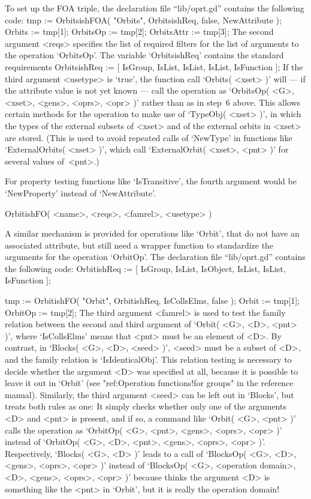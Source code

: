 To set  up the FOA  triple, the declaration file ``lib/oprt.gd'' contains
the following code:
\begintt
    tmp := OrbitsishFOA( "Orbits", OrbitsishReq, false, NewAttribute );
    Orbits     := tmp[1];
    OrbitsOp   := tmp[2];
    OrbitsAttr := tmp[3];
\endtt
The second argument <reqs> specifies the list of required filters for the
list    of   arguments  to    the  operation   `OrbitsOp'.   The variable
`OrbitsishReq' contains the standard requirements
\begintt
    OrbitsishReq := [ IsGroup, IsList,
		      IsList,
		      IsList,
		      IsFunction ];
\endtt
If the third  argument <usetype> is   `true', the function  call `Orbits(
<xset> )' will --- if  the attribute value is  not yet known --- call the
operation as `OrbitsOp( <G>, <xset>, <gens>, <oprs>, <opr> )' rather than
as in step~6 above. This allows certain methods for the operation to make
use of `TypeObj( <xset> )', in which the types of the external subsets of
<xset> and of the external orbits in <xset> are stored.  (This is used to
avoid repeated calls   of  `NewType' in  functions  like `ExternalOrbits(
<xset> )', which call `ExternalOrbit( <xset>, <pnt> )' for several values
of~<pnt>.)

For  property testing functions  like `IsTransitive', the fourth argument
would be `NewProperty' instead of `NewAttribute'.

\>OrbitishFO( <name>, <reqs>, <famrel>, <usetype> )

A similar mechanism is provided for operations  like `Orbit', that do not
have  an associated  attribute, but   still need a  wrapper function   to
standardize  the arguments for the  operation  `OrbitOp'. The declaration
file ``lib/oprt.gd'' contains the following code:
\begintt
    OrbitishReq  := [ IsGroup, IsList, IsObject,
		      IsList,
		      IsList,
		      IsFunction ];
    
    tmp := OrbitishFO( "Orbit", OrbitishReq, IsCollsElms, false );
    Orbit   := tmp[1];
    OrbitOp := tmp[2];
\endtt
The third argument <famrel>  is used to  test the family relation between
the  second  and third  argument of  `Orbit(  <G>, <D>,  <pnt> )',  where
`IsCollsElms' means that <pnt> must be an element of <D>. By contrast, in
`Blocks( <G>, <D>,  <seed> )', <seed> must be   a subset of <D>, and  the
family relation is `IsIdenticalObj'. This  relation testing is  necessary
to decide whether  the argument <D> was  specified at all,  because it is
possible to leave it  out  in `Orbit' (see  "ref:Operation  functions!for
groups" in the reference  manual).  Similarly, the third argument  <seed>
can be  left out in  `Blocks', but {\GAP}   treats both rules as  one: It
simply checks whether only one of the arguments <D> and <pnt> is present,
and if so, a command  like `Orbit( <G>, <pnt> )'  calls the operation  as
`OrbitOp( <G>, <pnt>, <gens>, <oprs>,  <opr> )' instead of `OrbitOp( <G>,
<D>, <pnt>, <gens>, <oprs>, <opr> )'.  Respectively, `Blocks( <G>, <D> )'
leads to a call of `BlocksOp( <G>,  <D>, <gens>, <oprs>, <opr> )' instead
of `BlocksOp(  <G>,  <operation domain>,  <D>,  <gens>,  <oprs>, <opr> )'
because {\GAP} thinks  the  argument <D> is  something like  the <pnt> in
`Orbit', but it is really the operation domain!

